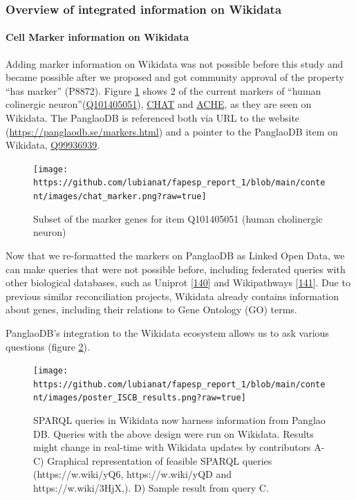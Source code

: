 \hypertarget{overview-of-integrated-information-on-wikidata}{%
\subsubsection{Overview of integrated information on Wikidata}\label{overview-of-integrated-information-on-wikidata}}

\hypertarget{cell-marker-information-on-wikidata}{%
\paragraph{Cell Marker information on Wikidata}\label{cell-marker-information-on-wikidata}}

Adding marker information on Wikidata was not possible before this study and became possible after we proposed and got community approval of the property ``has marker'' (P8872).
Figure \ref{fig:chat_marker} shows 2 of the current markers of ``human colinergic neuron''(\href{http://www.wikidata.org/entity/Q101405051}{Q101405051}), \href{http://www.wikidata.org/entity/Q14863671}{CHAT} and \href{http://www.wikidata.org/entity/Q407983}{ACHE}, as they are seen on Wikidata.
The PanglaoDB is referenced both via URL to the website (\url{https://panglaodb.se/markers.html}) and a pointer to the PanglaoDB item on Wikidata, \href{http://www.wikidata.org/entity/Q99936939}{Q99936939}.

\begin{figure}
\hypertarget{fig:chat_marker}{%
\centering
\texttt{[image: https://github.com/lubianat/fapesp\_report\_1/blob/main/content/images/chat\_marker.png?raw=true]}
\caption{Subset of the marker genes for item Q101405051 (human cholinergic neuron)}\label{fig:chat_marker}
}
\end{figure}

Now that we re-formatted the markers on PanglaoDB as Linked Open Data, we can make queries that were not possible before, including federated queries with other biological databases, such as Uniprot {[}\protect\hyperlink{ref-HUJ9NzAb}{140}{]}
and Wikipathways {[}\protect\hyperlink{ref-AgOOCR24}{141}{]}.
Due to previous similar reconciliation projects, Wikidata already contains information about genes, including their relations to Gene Ontology (GO) terms.

PanglaoDB's integration to the Wikidata ecosystem allows us to ask various questions (figure \ref{fig:iscb_results}).

\begin{figure}
\hypertarget{fig:iscb_results}{%
\centering
\texttt{[image: https://github.com/lubianat/fapesp\_report\_1/blob/main/content/images/poster\_ISCB\_results.png?raw=true]}
\caption{SPARQL queries in Wikidata now harness information from Panglao DB. Queries with the above design were run on Wikidata. Results might change in real-time with Wikidata updates by contributors A-C) Graphical representation of feasible SPARQL queries (https://w.wiki/yQ6, https://w.wiki/yQD and https://w.wiki/3HjX,). D) Sample result from query C.}\label{fig:iscb_results}
}
\end{figure}

